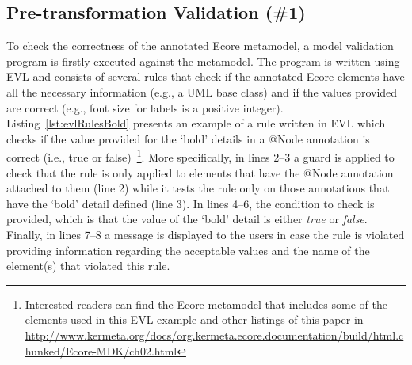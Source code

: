\subsection{Pre-transformation Validation (\#1)}
To check the correctness of the annotated Ecore metamodel, a model validation program is firstly executed against the metamodel.
The program is written using EVL and consists of several rules that check if the annotated Ecore elements have all the necessary information (e.g., a UML base class) and if the values provided are correct (e.g., font size for labels is a positive integer). 
Listing~\ref{lst:evlRulesBold} presents an example of a rule written in EVL which checks if the value provided for the `bold' details in a @Node annotation is correct (i.e., true or false)~\footnote{Interested readers can find the Ecore metamodel that includes some of the elements used in this EVL example and other listings of this paper in \url{http://www.kermeta.org/docs/org.kermeta.ecore.documentation/build/html.chunked/Ecore-MDK/ch02.html}}. More specifically, in lines 2--3 a guard is applied to check that the rule is only applied to elements that have the @Node annotation attached to them (line 2) while it tests the rule only on those annotations that have the `bold' detail defined (line 3). 
In lines 4--6, the condition to check is provided, which is that the value of the `bold' detail is either \textit{true} or \textit{false}. 
Finally, in lines 7--8 a message is displayed to the users in case the rule is violated providing information regarding the acceptable values and the name of the element(s) that violated this rule.



